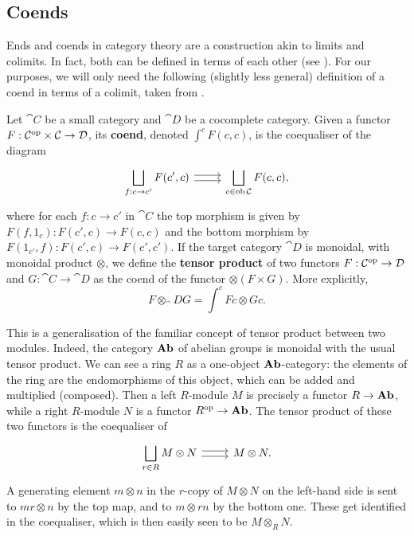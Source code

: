 \subsection{Coends}
Ends and coends in category theory are a construction akin to limits and colimits. In fact, both can be defined in terms of each other (see \cite[\S IX.5]{MacLane1978}). For our purposes, we will only need the following (slightly less general) definition of a coend in terms of a colimit, taken from \cite{Otter2018}.
\begin{definition}\label{def:coend}
    Let $\cat{C}$ be a small category and $\cat{D}$ be a cocomplete category. Given a functor $F: \mathcal{C}^{\mathrm{op}} \times \mathcal{C} \to \mathcal{D}$, its \textbf{coend}, denoted $\int^c F(c,c)$, is the coequaliser of the diagram
    \[\begin{tikzcd}
    \displaystyle \bigsqcup_{f : c \to c'} F(c',c) \ar[r, shift left] \ar[r, shift right] & \displaystyle \bigsqcup_{c \in \ob \cat{C}} F(c,c),
    \end{tikzcd}\]
    where for each $f: c \to c'$ in $\cat{C}$ the top morphism is given by $F(f, 1_c) : F(c',c) \to F(c,c)$ and the bottom morphism by $F(1_{c'}, f) : F(c',c) \to F(c',c')$.
If the target category $\cat{D}$ is monoidal, with monoidal product $\otimes$, we define the \textbf{tensor product} of two functors $F: \mathcal{C}^{\mathrm{op}} \to \mathcal{D}$ and $G: \cat{C} \to \cat{D}$ as the coend of the functor $\otimes (F \times G)$. More explicitly, 
\[F \otimes_\cat{D} G = \int^c Fc \otimes Gc.\]
\end{definition}
This is a generalisation of the familiar concept of tensor product between two modules. Indeed, the category $\mathbf{Ab}$ of abelian groups is monoidal with the usual tensor product. We can see a ring $R$ as a one-object $\mathbf{Ab}$-category: the elements of the ring are the endomorphisms of this object, which can be added and multiplied (composed). Then a left $R$-module $M$ is precisely a functor $R \to \mathbf{Ab}$, while a right $R$-module $N$ is a functor $R^{\mathrm{op}} \to \mathbf{Ab}$. The tensor product of these two functors is the coequaliser of
\[\begin{tikzcd}
    \displaystyle \bigsqcup_{r \in R} M \otimes N \ar[r, shift left] \ar[r, shift right] & M \otimes N.
\end{tikzcd}\]
A generating element $m \otimes n$ in the $r$-copy of $M \otimes N$ on the left-hand side is sent to $mr \otimes n$ by the top map, and to $m \otimes rn$ by the bottom one. These get identified in the coequaliser, which is then easily seen to be $M \otimes_R N$.

